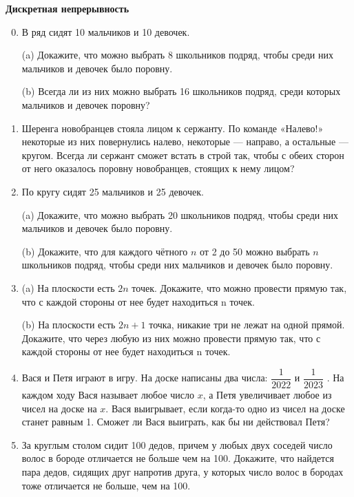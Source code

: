 \documentclass{article}
\begin{document}
\large
	
\begin{center}
	\textbf{Дискретная непрерывность}
\end{center}

\begin{enumerate}[label*=\protect\fbox{\arabic{enumi}}]
	
\setcounter{enumi}{-1}

\item В ряд сидят 10 мальчиков и 10 девочек.

(a) Докажите, что можно выбрать 8 школьников подряд, чтобы среди них мальчиков и девочек
было поровну.

(b) Всегда ли из них можно выбрать 16 школьников подряд, среди которых мальчиков и девочек поровну?

\item Шеренга новобранцев стояла лицом к сержанту. По команде «Налево!» некоторые из них повернулись налево, некоторые — направо, а остальные — кругом. Всегда ли сержант сможет встать в строй так, чтобы с обеих сторон от него оказалось поровну новобранцев, стоящих к нему лицом?

\item По кругу сидят 25 мальчиков и 25 девочек.

(a) Докажите, что можно выбрать 20 школьников подряд, чтобы среди них мальчиков и девочек
было поровну.

(b) Докажите, что для каждого чётного $n$ от 2 до 50 можно выбрать $n$ школьников подряд, чтобы среди них мальчиков и девочек было поровну.

\item 

(a) На плоскости есть $2n$ точек. Докажите, что можно провести прямую так, что с каждой стороны от нее будет находиться n точек.

(b) На плоскости есть $2n + 1$ точка, никакие три не лежат на одной прямой. Докажите, что через любую из них можно провести прямую так, что с каждой стороны от нее будет находиться n точек.

\item Вася и Петя играют в игру. На доске написаны два числа: $\dfrac{1}{2022}$ и  $\dfrac{1}{2023}$ . На каждом ходу Вася называет любое число $x$, а Петя увеличивает любое из чисел на доске на $x$. Вася выигрывает, если когда-то одно из чисел на доске станет равным 1. Сможет ли Вася выиграть, как бы ни действовал Петя?

\item За круглым столом сидит 100 дедов, причем у любых двух соседей число волос в бороде отличается не больше чем на 100. Докажите, что найдется пара дедов, сидящих друг напротив друга, у которых число волос в бородах тоже отличается не больше, чем на 100.


\end{enumerate}
\end{document}
